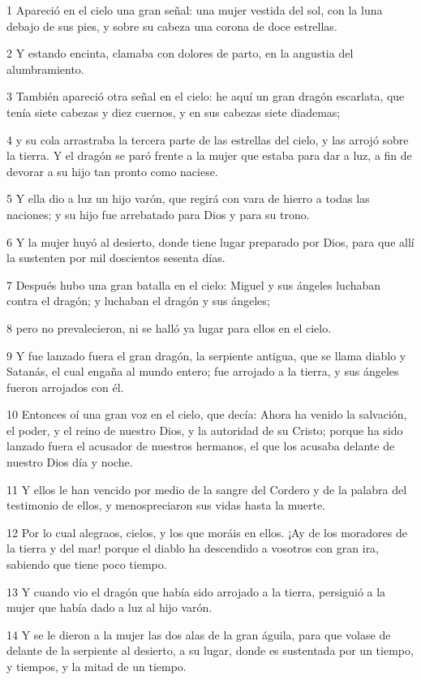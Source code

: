 \par 1 Apareció en el cielo una gran señal: una mujer vestida del sol, con la luna debajo de sus pies, y sobre su cabeza una corona de doce estrellas.
\par 2 Y estando encinta, clamaba con dolores de parto, en la angustia del alumbramiento.
\par 3 También apareció otra señal en el cielo: he aquí un gran dragón escarlata, que tenía siete cabezas y diez cuernos, y en sus cabezas siete diademas;
\par 4 y su cola arrastraba la tercera parte de las estrellas del cielo, y las arrojó sobre la tierra. Y el dragón se paró frente a la mujer que estaba para dar a luz, a fin de devorar a su hijo tan pronto como naciese.
\par 5 Y ella dio a luz un hijo varón, que regirá con vara de hierro a todas las naciones; y su hijo fue arrebatado para Dios y para su trono.
\par 6 Y la mujer huyó al desierto, donde tiene lugar preparado por Dios, para que allí la sustenten por mil doscientos sesenta días.
\par 7 Después hubo una gran batalla en el cielo: Miguel y sus ángeles luchaban contra el dragón; y luchaban el dragón y sus ángeles;
\par 8 pero no prevalecieron, ni se halló ya lugar para ellos en el cielo.
\par 9 Y fue lanzado fuera el gran dragón, la serpiente antigua, que se llama diablo y Satanás, el cual engaña al mundo entero; fue arrojado a la tierra, y sus ángeles fueron arrojados con él.
\par 10 Entonces oí una gran voz en el cielo, que decía: Ahora ha venido la salvación, el poder, y el reino de nuestro Dios, y la autoridad de su Cristo; porque ha sido lanzado fuera el acusador de nuestros hermanos, el que los acusaba delante de nuestro Dios día y noche.
\par 11 Y ellos le han vencido por medio de la sangre del Cordero y de la palabra del testimonio de ellos, y menospreciaron sus vidas hasta la muerte.
\par 12 Por lo cual alegraos, cielos, y los que moráis en ellos. ¡Ay de los moradores de la tierra y del mar! porque el diablo ha descendido a vosotros con gran ira, sabiendo que tiene poco tiempo.
\par 13 Y cuando vio el dragón que había sido arrojado a la tierra, persiguió a la mujer que había dado a luz al hijo varón.
\par 14 Y se le dieron a la mujer las dos alas de la gran águila, para que volase de delante de la serpiente al desierto, a su lugar, donde es sustentada por un tiempo, y tiempos, y la mitad de un tiempo.
